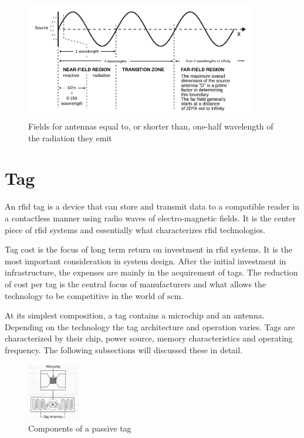 \begin{figure}[!ht]
    \centering
    \includegraphics[width=0.9\textwidth]{./figs/02-state-of-the-art/Field_regions_for_typical_antennas_vector.pdf}
    \caption{Fields for antennas equal to, or shorter than, one-half wavelength of the radiation they emit~\cite{SafetyHealthTopics}} 
    \label{fig:fieldregionsshortantenna}
\end{figure}

\section{Tag} \label{sec:tag}

An \ac{rfid} tag is a device that can store and transmit data to a compatible reader in a contactless manner using radio waves of electro-magnetic fields.
It is the center piece of \ac{rfid} systems and essentially what characterizes \ac{rfid} technologies. 

Tag cost is the focus of long term return on investment in \ac{rfid} systems. It is the most important consideration in system design. After the initial investment in infrastructure, the expenses are mainly in the acquirement of tags.
The reduction of cost per tag is the central focus of manufacturers and what allows the technology to be competitive in the world of \ac{scm}.

At its simplest composition, a tag contains a microchip and an antenna.
Depending on the technology the tag architecture and operation varies.
Tags are characterized by their chip, power source, memory characteristics and operating frequency. The following subsections will discussed these in detail.

\begin{figure}[!ht]
    \centering
    \includegraphics[width=0.2\textwidth]{./figs/02-state-of-the-art/tag.jpg}
    \caption{Components of a passive tag~\cite{lahiriRFIDSourcebook2005}} 
    \label{fig:passivetag}
\end{figure}

